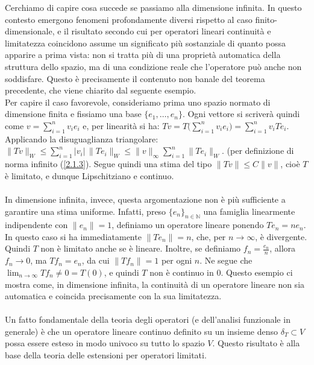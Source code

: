 \documentclass[a4paper,12pt]{report}
\begin{document}
\vspace{0.5cm}
Cerchiamo di capire cosa succede se passiamo alla dimensione infinita. In questo contesto emergono fenomeni profondamente diversi rispetto al caso finito-dimensionale, e il risultato secondo cui per operatori lineari continuità e limitatezza coincidono assume un significato più sostanziale di quanto possa apparire a prima vista: non si tratta più di una proprietà automatica della struttura dello spazio, ma di una condizione reale che l’operatore può anche non soddisfare. Questo è precisamente il contenuto non banale del teorema precedente, che viene chiarito dal seguente esempio. 
\\Per capire il caso favorevole, consideriamo prima uno spazio normato di dimensione finita e fissiamo una base $\{e_1,\dots,e_n\}$. Ogni vettore si scriverà quindi come $v=\sum_{i=1}^n v_i e_i$ e, per linearità si ha: $Tv=T\bigg(\sum_{i=1}^nv_ie_i\bigg)=\sum_{i=1}^n v_i Te_i$.
\\Applicando la disuguaglianza triangolare: $\|Tv\|_W\le \sum_{i=1}^n |v_i|\,\|Te_i\|_W\le \|v\|_\infty \sum_{i=1}^n \|Te_i\|_W$.
(per definizione di norma infinito (\ref{2.1.3}).
Segue quindi una stima del tipo $\|Tv\|\le C\|v\|$, cioè $T$ è limitato, e dunque Lipschitziano e continuo.
\\
\\In dimensione infinita, invece, questa argomentazione non è più sufficiente a garantire una stima uniforme. Infatti, preso $\{e_n\}_{n\in\mathbb{N}}$ una famiglia linearmente indipendente con $\|e_n\|=1$, definiamo un operatore lineare ponendo $T e_n = n e_n$. In questo caso si ha immediatamente $\|T e_n\|=n$, che, per $n\to\infty$, è divergente. Quindi $T$ non è limitato anche se è lineare. Inoltre, se definiamo $f_n=\frac{e_n}{n}$, allora $f_n \to 0$, ma $T f_n = e_n$, da cui $\|T f_n\|=1$ per ogni $n$. Ne segue che $\displaystyle\lim_{n\to\infty}Tf_n\neq 0=T(0)$, e quindi $T$ non è continuo in $0$. Questo esempio ci mostra come, in dimensione infinita, la continuità di un operatore lineare non sia automatica e coincida precisamente con la sua limitatezza.
\\
\\ Un fatto fondamentale della teoria degli operatori (e dell'analisi funzionale in generale) è che un operatore lineare continuo definito su un insieme denso $\delta_T\subset V$ possa essere esteso in modo univoco su tutto lo spazio $V$. Questo risultato è alla base della teoria delle estensioni per operatori limitati.
\end{document}
